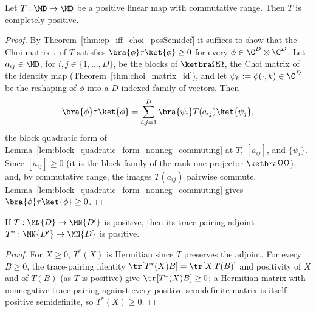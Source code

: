\begin{lemma}
    \label{lem:cp_from_positivity_commutative_codomain}
    \leanok
    Let $T:\MD\to\MD$ be a positive linear map with commutative range. Then
    $T$ is completely positive.
\end{lemma}

\begin{proof}\leanok
    By Theorem~\ref{thm:cp_iff_choi_posSemidef} it suffices to show that the
    Choi matrix $\tau$ of $T$ satisfies $\bra{\phi}\tau\ket{\phi}\ge0$ for
    every $\phi\in\C^D\otimes\C^D$. Let $a_{ij}\in\MD$, for
    $i,j\in\{1,\dots,D\}$, be the blocks of $\ketbra\Omega\Omega$, the Choi
    matrix of the identity map (Theorem~\ref{thm:choi_matrix_id}), and let
    $\psi_k:=\phi(\cdot,k)\in\C^D$ be the reshaping of $\phi$ into a
    $D$-indexed family of vectors. Then
    \begin{align}
        \bra{\phi}\tau\ket{\phi}
        = \sum_{i,j=1}^{D}\bra{\psi_i}T(a_{ij})\ket{\psi_j},
        \notag
    \end{align}
    the block quadratic form of
    Lemma~\ref{lem:block_quadratic_form_nonneg_commuting} at $T$, $[a_{ij}]$,
    and $\{\psi_i\}$. Since $[a_{ij}]\ge0$ (it is the block family of the
    rank-one projector $\ketbra\Omega\Omega$) and, by commutative range, the
    images $T(a_{ij})$ pairwise commute,
    Lemma~\ref{lem:block_quadratic_form_nonneg_commuting} gives
    $\bra{\phi}\tau\ket{\phi}\ge0$.
\end{proof}

\begin{lemma}
    \label{lem:positive_map_traceAdjointMap}
    \leanok
    If $T:\MN{D}\to\MN{D'}$ is positive, then its
    trace-pairing adjoint
    $T^*:\MN{D'}\to\MN{D}$ is positive.
\end{lemma}

\begin{proof}\leanok
    For $X\ge0$, $T^*(X)$ is Hermitian since $T$ preserves the adjoint. For
    every $B\ge0$, the trace-pairing identity $\tr[T^*(X)B]=\tr[X\,T(B)]$
    and positivity of $X$ and of $T(B)$ (as $T$ is positive) give
    $\tr[T^*(X)B]\ge0$; a Hermitian matrix with nonnegative trace pairing
    against every positive semidefinite matrix is itself positive
    semidefinite, so $T^*(X)\ge0$.
\end{proof}

